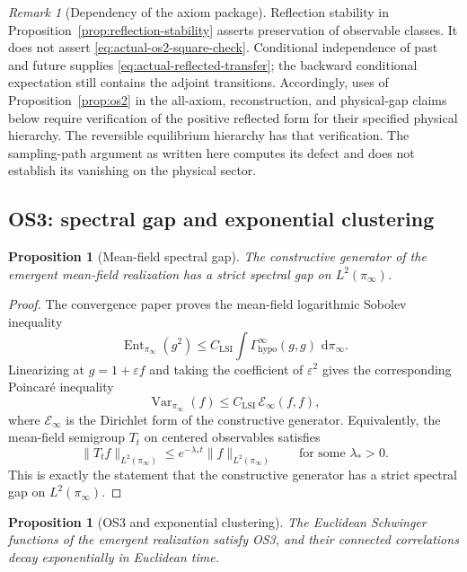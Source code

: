 \documentclass[11pt]{article}
\newtheorem{proposition}[theorem]{Proposition}
\theoremstyle{definition}
\theoremstyle{remark}
\newtheorem{remark}[theorem]{Remark}
\newcommand{\dd}{\,\mathrm d}
\newcommand{\Ent}{\operatorname{Ent}}
\newcommand{\Var}{\operatorname{Var}}
\begin{document}
\begin{remark}[Dependency of the axiom package]
Reflection stability in Proposition~\ref{prop:reflection-stability}
asserts preservation of observable classes. It does not assert
\eqref{eq:actual-os2-square-check}. Conditional independence of past
and future supplies \eqref{eq:actual-reflected-transfer}; the backward
conditional expectation still contains the adjoint transitions.
Accordingly, uses of Proposition~\ref{prop:os2} in the all-axiom,
reconstruction, and physical-gap claims below require verification of
the positive reflected form for their specified physical hierarchy.
The reversible equilibrium hierarchy has that verification. The
sampling-path argument as written here computes its defect and does
not establish its vanishing on the physical sector.
\end{remark}


\subsection{OS3: spectral gap and exponential clustering}

\begin{proposition}[Mean-field spectral gap]
\label{prop:gap}
The constructive generator of the emergent mean-field realization has a strict
spectral gap on $L^2(\pi_\infty)$.
\end{proposition}

\begin{proof}
The convergence paper proves the mean-field logarithmic Sobolev inequality
\[
\Ent_{\pi_\infty}(g^2)
\le
C_{\mathrm{LSI}}
\int \Gamma_{\mathrm{hypo}}^\infty(g,g)\,\dd\pi_\infty.
\]
Linearizing at $g=1+\varepsilon f$ and taking the coefficient of
$\varepsilon^2$ gives the corresponding Poincar\'e inequality
\[
\Var_{\pi_\infty}(f)
\le
C_{\mathrm{LSI}}\,
\mathcal E_\infty(f,f),
\]
where $\mathcal E_\infty$ is the Dirichlet form of the constructive generator.
Equivalently, the mean-field semigroup $T_t$ on centered observables satisfies
\[
\|T_t f\|_{L^2(\pi_\infty)}
\le
e^{-\lambda_* t}\|f\|_{L^2(\pi_\infty)}
\qquad
\text{for some }\lambda_*>0.
\]
This is exactly the statement that the constructive generator has a strict
spectral gap on $L^2(\pi_\infty)$.
\end{proof}

\begin{proposition}[OS3 and exponential clustering]
\label{prop:os3}
The Euclidean Schwinger functions of the emergent realization satisfy OS3, and
their connected correlations decay exponentially in Euclidean time.
\end{proposition}
\end{document}
